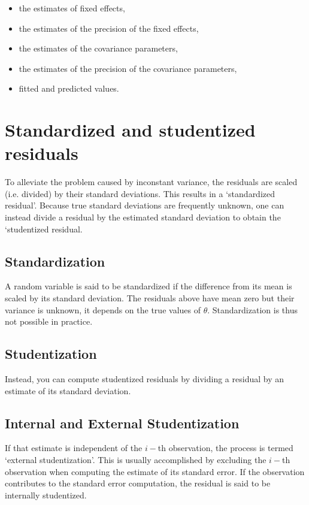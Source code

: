 \documentclass[Main.tex]{subfiles}
\begin{document}
\begin{itemize}
\item the estimates of fixed effects,
\item the estimates of the precision of the fixed effects,
\item the estimates of the covariance parameters,
\item the estimates of the precision of the covariance parameters,
\item fitted and predicted values.
\end{itemize}







\newpage
\section{Standardized and studentized residuals} %


To alleviate the problem caused by inconstant variance, the residuals are scaled (i.e. divided) by their standard deviations. This results in a `standardized residual'. Because true standard deviations are frequently unknown, one can instead divide a residual by the estimated standard deviation to obtain the `studentized residual.


\subsection{Standardization} %


A random variable is said to be standardized if the difference from its mean is scaled by its standard deviation. The residuals above have mean zero but their variance is unknown, it depends on the true values of $\theta$. Standardization is thus not possible in practice.


\subsection{Studentization} %
Instead, you can compute studentized residuals by dividing a residual by an estimate of its standard deviation.


\subsection{Internal and External Studentization} %
If that estimate is independent of the $i-$th observation, the process is termed `external studentization'. This is usually accomplished by excluding the $i-$th observation when computing the estimate of its standard error. If the observation contributes to the
standard error computation, the residual is said to be internally studentized.
\end{document}
